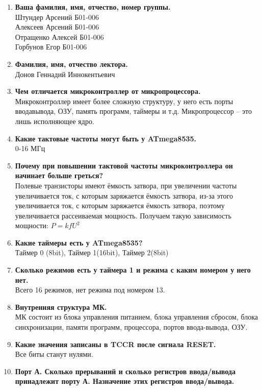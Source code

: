 \documentclass[a4paper, 12pt, twoside]{article}
\begin{document}
\begin{enumerate}
	\item \textbf{Ваша фамилия, имя, отчество, номер группы.}\\
		Штундер Арсений Б01-006 \\
		Алексеев Арсений Б01-006 \\
		Отращенко Алексей Б01-006 \\
		Горбунов Егор Б01-006

	\item \textbf{Фамилия, имя, отчество лектора.}\\
		Донов Геннадий Иннокентьевич
	\item \textbf{Чем отличается микроконтроллер от микропроцессора.}\\
		Микроконтроллер имеет более сложную структуру, у него есть порты вводавывода, ОЗУ, память программ, таймеры и т.д. Микропроцессор – это лишь исполняющее
ядро.
	\item \textbf{Какие тактовые частоты могут быть у ATmega8535.}\\
		0-16 МГц
	\item \textbf{Почему при повышении тактовой частоты микроконтроллера он начинает
больше греться?}\\
		Полевые транзисторы имеют ёмкость затвора, при увеличении частоты увеличивается ток, с которым заряжается ёмкость затвора, из-за этого увеличивается ток, с которым заряжается ёмкость затвора, поэтому увеличивается рассеиваемая мощность. Получаем такую зависимость мощности: $P = kfU^2$
	\item \textbf{Какие таймеры есть у ATmega8535?}\\
		Таймер 0 (8bit), Таймер 1(16bit), Таймер 2(8bit)
	\item \textbf{Сколько режимов есть у таймера 1 и режима с каким номером у него нет.}\\
		Всего 16 режимов, нет режима под номером 13. 
	\item \textbf{Внутренняя структура МК.}\\
		МК состоит из блока управления питанием, блока управления сбросом, блока синхронизации, памяти программ, процессора, портов ввода-вывода, ОЗУ.
	\item \textbf{Какие значения записаны в TCCR после сигнала RESET.}\\
		Все биты станут нулями.
	\item \textbf{Порт А. Сколько прерываний и сколько регистров ввода/вывода принадлежит порту А. Назначение этих регистров ввода/вывода.}\\

\end{enumerate}
\end{document}
